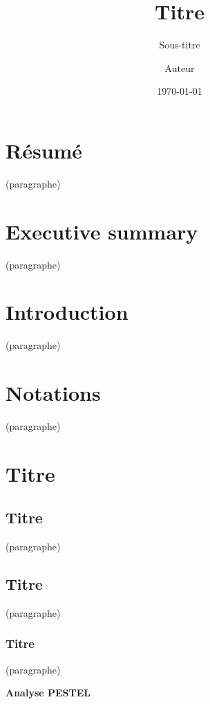 \documentclass[a4paper]{article}
\author{Auteur}
\date{\today}
\title{Titre}
\subtitle{Sous-titre}%
\begin{document}
	\maketitle 
	
	\tableofcontents
\newpage

\setlength{\parindent}{2em}


\section*{Résumé}
\setlength{\parindent}{2em}
(paragraphe)


\newpage
{}
\section*{Executive summary}
(paragraphe)


\newpage
{}
\section*{Introduction}
(paragraphe)

\newpage

\section*{Notations}
(paragraphe)

\newpage

\section{Titre}

\subsection{Titre}
(paragraphe)


\subsection{Titre}
(paragraphe)

\subsubsection{Titre}
(paragraphe)

\begin{center}
    \textbf{Analyse PESTEL}
\end{center}
\end{document}
